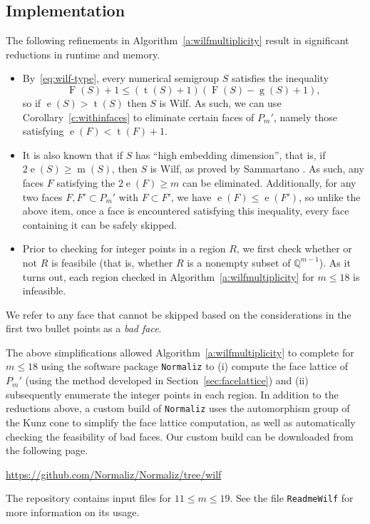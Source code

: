 \documentclass[12pt]{amsart}
\theoremstyle{definition}
\numberwithin{equation}{section}
\newcommand{\ring}[1]{\ensuremath{\mathbb{#1}}}
\renewcommand\>{\rangle}
\newcommand\<{\langle}
\newcommand\0{\mathbf{0}}
\newcommand\QQ{\ring{Q}}
\begin{document}
\subsection*{Implementation}

The following refinements in Algorithm~\ref{a:wilfmultiplicity} result in significant reductions in runtime and memory. 

\begin{itemize}
\item 
By~\eqref{eq:wilf-type}, every numerical semigroup $S$ satisfies the inequality
\[
\operatorname{F}(S) + 1 \le (\operatorname{t}(S) + 1)(\operatorname{F}(S) - \operatorname{g}(S) + 1),
\]
so if $\operatorname{e}(S) > \operatorname{t}(S)$ then $S$ is Wilf.  As such, we can use Corollary~\ref{c:withinfaces} to eliminate certain faces of $P_m'$, namely those satisfying $\operatorname{e}(F) < \operatorname{t}(F) + 1$.

\item 
It is also known that if $S$ has ``high embedding dimension'', that is, if $2\operatorname e(S) \ge \operatorname m(S)$, then $S$ is Wilf, as proved by Sammartano \cite{samm}.  As such, any faces $F$ satisfying the $2\operatorname e(F) \ge m$ can be eliminated.  Additionally, for any two faces $F, F' \subset P_m'$ with $F \subset F'$, we have $\operatorname e(F) \le \operatorname e(F')$, so unlike the above item, once a face is encountered satisfying this inequality, every face containing it can be safely skipped.  

\item 
Prior to checking for integer points in a region $R$, we first check whether or not $R$ is feasibile (that is, whether $R$ is a nonempty subset of $\QQ^{m-1}$).  As it turns out, each region checked in Algorithm~\ref{a:wilfmultiplicity} for $m \le 18$ is infeasible. 

\end{itemize}
We refer to any face that cannot be skipped based on the considerations in the first two bullet points as a \emph{bad face}.

The above simplifications allowed Algorithm~\ref{a:wilfmultiplicity} to complete for $m \le 18$ using the software package \texttt{Normaliz} \cite{Normaliz} to (i) compute the face lattice of $P_m'$ (using the method developed in Section~\ref{sec:facelattice}) and (ii) subsequently enumerate the integer points in each region.  In addition to the reductions above, a custom build of \texttt{Normaliz} uses the automorphism group of the Kunz cone to simplify the face lattice computation, as well as automatically checking the feasibility of bad faces.  Our custom build can be downloaded from the following page.  
\begin{center}
\url{https://github.com/Normaliz/Normaliz/tree/wilf}
\end{center}
The repository contains input files for $11 \le m \le 19$.  See the file \texttt{ReadmeWilf} for more information on its usage.  
\end{document}
